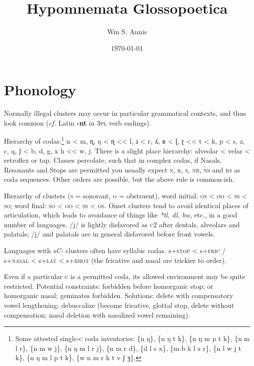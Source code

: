\documentclass[11pt]{article}
\newcommand{\LL}[1]{\textbf{#1}}  %
\newcommand{\I}[1]{\textsc{#1}}   %
\begin{document}
\frenchspacing
\title{Hypomnemata Glossopoetica}
\author{Wm S. Annis}
\date{\today}
\maketitle

\section{Phonology}

Normally illegal clusters may occur in particular grammatical
contexts, and thus look common (\textit{cf.} Latin \LL{-nt} in \I{3pl}
verb endings).

Hierarchy of codas:\footnote{Some attested single-\I{c} coda
  inventories: \{n ŋ\}, \{n ŋ t k\}, \{n ŋ m p t k\}, \{n m l r\}, \{n
  m w j\}, \{n ŋ m l r j\}, \{n m r d\}, \{d l s x\}, \{m b k l z r\},
  \{n l w j t k\}, \{n ŋ m l p t k\}, \{w n m r k t v ʃ ʒ\}.} n < m,
ɳ, ŋ < ɳ << l, ɹ < r, ʎ, ʁ < ɭ, ɽ << t < k, p < s, z, c, q, ʃ < b, d,
g, x h << w, j.  There is a slight place hierarchy: alveolar < velar <
retroflex or tap.  Classes percolate, such that in complex codas, if
Nasals, Resonants and Stops are permitted you usually expect \I{n, r,
  s, nr, ns} and \I{rs} as coda sequences.  Other orders are possible,
but the above rule is common-ish.

Hierarchy of clusters (\I{s} = sonorant, \I{o} = obstruent), word
initial: \I{os} < \I{oo} < \I{ss} < \I{so}; word final: \I{so} <
\I{oo} < \I{ss} < \I{os}.  Onset clusters tend to avoid identical
places of articulation, which leads to avoidance of things like
\textit{*tl, dl, bw,} etc., in a good number of languages. /j/ is
lightly disfavored as \I{c2} after dentals, alveolars and palatals;
/j/ and palatals are in general disfavored before front vowels.

Languages with \textit{sC-} clusters often have syllabic codas.
s+\I{stop} < s+\I{fric} / s+\I{nasal} < s+\I{lat} < s+\I{rhot} (the
fricative and nasal are trickier to order).

Even if a particular \I{c} is a permitted coda, its allowed
environment may be quite restricted. Potential constraints: forbidden
before homorganic stop; or homorganic nasal; geminates
forbidden. Solutions: delete with compensatory vowel lengthening;
debuccalize (become fricative, glottal stop, delete without
compensation; nasal deletion with nasalized vowel remaining).
\end{document}
